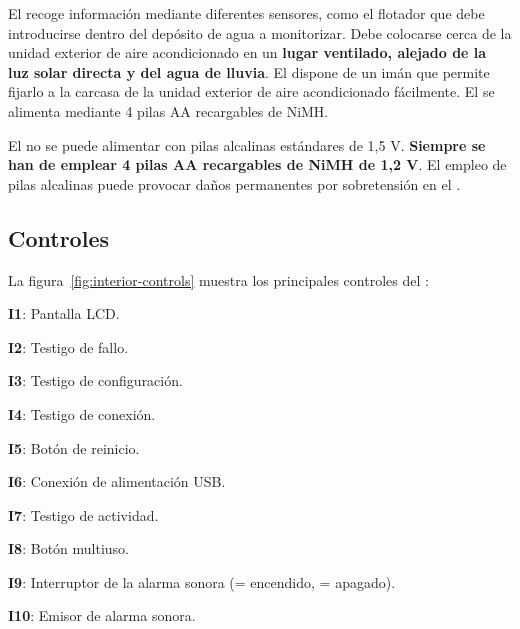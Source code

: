 El \MEE recoge información mediante diferentes sensores, como el flotador que debe introducirse dentro del depósito de agua a monitorizar.
Debe colocarse cerca de la unidad exterior de aire acondicionado en un \textbf{lugar ventilado, alejado de la luz solar directa y del agua de lluvia}.
El \ME dispone de un imán que permite fijarlo a la carcasa de la unidad exterior de aire acondicionado fácilmente.
El \MEE se alimenta mediante 4 pilas AA recargables de NiMH.

El \MEE no se puede alimentar con pilas alcalinas estándares de 1,5 V. \textbf{Siempre se han de emplear 4 pilas AA recargables de NiMH de 1,2 V}. El empleo de pilas alcalinas puede provocar daños permanentes por sobretensión en el \ME. 
\importantend

\endgroup

\subsection{Controles}
\label{sect:controles}

La figura~\ref{fig:interior-controls} muestra los principales controles del \MI:


\begin{enumeratecompact}
  \item[\textbf{\color{main}I1}:] Pantalla LCD.
  \item[\textbf{\color{main}I2}:] Testigo de fallo.
  \item[\textbf{\color{main}I3}:] Testigo de configuración.
  \item[\textbf{\color{main}I4}:] Testigo de conexión.
  \item[\textbf{\color{main}I5}:] Botón de reinicio.
  \item[\textbf{\color{main}I6}:] Conexión de alimentación USB.
  \item[\textbf{\color{main}I7}:] Testigo de actividad.
  \item[\textbf{\color{main}I8}:] Botón multiuso.
  \item[\textbf{\color{main}I9}:] Interruptor de la alarma sonora (\on = encendido, \off = apagado).
  \item[\textbf{\color{main}I10}:] Emisor de alarma sonora.
\end{enumeratecompact}

